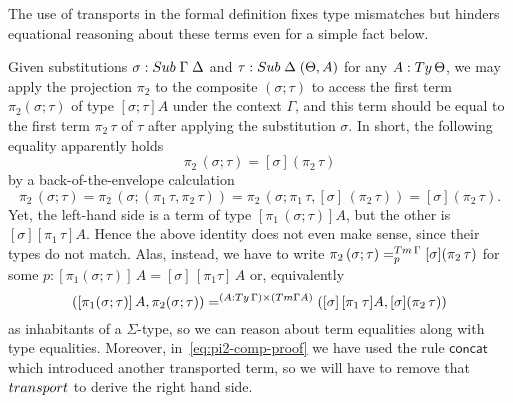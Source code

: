 \documentclass[a4paper,UKenglish,numberwithinsect,cleveref,thm-restate]{lipics-v2021}
\begin{document}
The use of transports in the formal definition fixes type mismatches but hinders equational reasoning about these terms even for a simple fact below.
\begin{example}\label{ex:pi2-comp}
  Given substitutions $\sigma : \Sub\;\Gamma\; \Delta$ and $\tau : \Sub\;\Delta\;(\Theta, A)$ for any $A : \Ty\,\Theta$, we may apply the projection $\pi_2$ to the composite $(\sigma; \tau)$ to access the first term $\pi_2(\sigma; \tau)$ of type $[\sigma;\tau] A$ under the context $\Gamma$, and this term should be equal to the first term $\pi_2\,\tau$ of $\tau$ after applying the substitution $\sigma$. 
  In short, the following equality apparently holds
  \[
    \pi_2\,(\sigma ; \tau) = [\sigma] (\pi_2\,\tau)
  \]
  by a back-of-the-envelope calculation
  \begin{equation} \label{eq:pi2-comp-proof}
    \pi_2\,(\sigma ; \tau) 
    = \pi_2\,(\sigma; (\pi_1\,\tau, \pi_2\,\tau))
    = \pi_2\,(\sigma;\pi_1\,\tau, [\sigma]\,(\pi_2\,\tau))
    = [\sigma] (\pi_2\,\tau).
  \end{equation}
  Yet, the left-hand side is a term of type $[\pi_1\,(\sigma;\tau)] A$, but the other is $[\sigma] [\pi_1\,\tau] A$.
  Hence the above identity does not even make sense, since their types do not match.
  Alas, instead, we have to write $\pi_2\,(\sigma ; \tau) =^{\Tm\,\Gamma}_{p} [\sigma] (\pi_2\,\tau)$ for some $p: [\pi_1(\sigma; \tau)]\,A = [\sigma]\,[\pi_1\tau]\,A$ or, equivalently
  \begin{equation}\label{eq:pi2-comp-real-proof}
    ([\pi_1(\sigma; \tau)]\,A, \pi_2(\sigma; \tau)) =^{(A : \Ty\,\Gamma) \times (\Tm \Gamma A)} ([\sigma]\,[\pi_1\,\tau]A, [\sigma] (\pi_2\,\tau))
  \end{equation}
  as inhabitants of a $\Sigma$-type, so we can reason about term equalities along with type equalities.
  Moreover, in~\eqref{eq:pi2-comp-proof} we have used the rule $\mathsf{concat}$ which introduced another transported term, so we will have to remove that $\transp$ to derive the right hand side.


\end{example}
\end{document}

